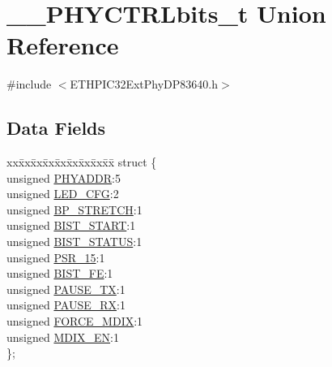 \hypertarget{union_____p_h_y_c_t_r_lbits__t}{}\section{\+\_\+\+\_\+\+P\+H\+Y\+C\+T\+R\+Lbits\+\_\+t Union Reference}
\label{union_____p_h_y_c_t_r_lbits__t}


{\ttfamily \#include $<$E\+T\+H\+P\+I\+C32\+Ext\+Phy\+D\+P83640.\+h$>$}

\subsection*{Data Fields}
\begin{DoxyCompactItemize}
\item 
\begin{tabbing}
xx\=xx\=xx\=xx\=xx\=xx\=xx\=xx\=xx\=\kill
struct \{\\
\>unsigned \hyperlink{union_____p_h_y_c_t_r_lbits__t_a4a51675b3f1a91ed3427a311fadb0f95}{PHYADDR}:5\\
\>unsigned \hyperlink{union_____p_h_y_c_t_r_lbits__t_a82dd39bbcd32e1e7365136884d962219}{LED\_CFG}:2\\
\>unsigned \hyperlink{union_____p_h_y_c_t_r_lbits__t_a6e2fc081657adb88ec35adca60b26f59}{BP\_STRETCH}:1\\
\>unsigned \hyperlink{union_____p_h_y_c_t_r_lbits__t_af0cf5692015bec08a0f9573a5b1e31a5}{BIST\_START}:1\\
\>unsigned \hyperlink{union_____p_h_y_c_t_r_lbits__t_aa2441b02968e26802be8c27fe13b2670}{BIST\_STATUS}:1\\
\>unsigned \hyperlink{union_____p_h_y_c_t_r_lbits__t_a8e23e3592770577bea4fb8233543f651}{PSR\_15}:1\\
\>unsigned \hyperlink{union_____p_h_y_c_t_r_lbits__t_a163b6a7bcb1fcbc1d1031b2bea863558}{BIST\_FE}:1\\
\>unsigned \hyperlink{union_____p_h_y_c_t_r_lbits__t_af25af8b9e750728b4b6df8c50b30558a}{PAUSE\_TX}:1\\
\>unsigned \hyperlink{union_____p_h_y_c_t_r_lbits__t_a52bf3c25d68cf73955ef6fcdc2195995}{PAUSE\_RX}:1\\
\>unsigned \hyperlink{union_____p_h_y_c_t_r_lbits__t_ab098e1df2ec30fe7609da13ae5529f5c}{FORCE\_MDIX}:1\\
\>unsigned \hyperlink{union_____p_h_y_c_t_r_lbits__t_ab76ff99cb6cc0595d87d68e0266d703a}{MDIX\_EN}:1\\
\}; \\


\end{tabbing}
\end{DoxyCompactItemize}
